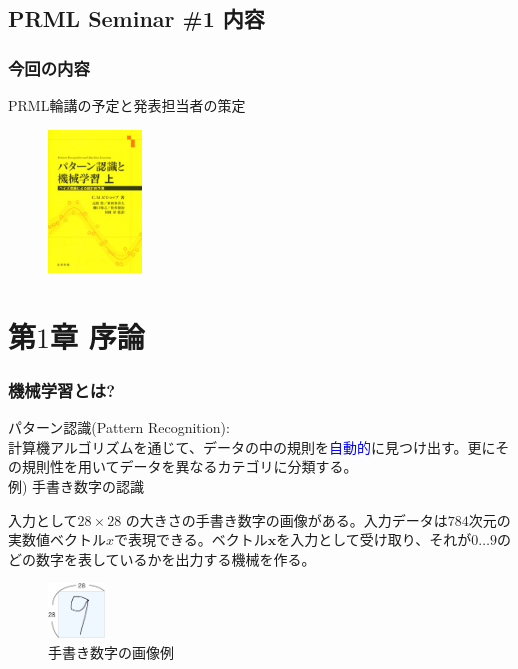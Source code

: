 \documentclass[dvipdfmx]{beamer}
\theoremstyle{definition}
\begin{document}
\subsection{PRML Seminar \#1 内容}
\begin{frame}
  \frametitle{今回の内容}
  PRML輪講の予定と発表担当者の策定
  \begin{figure}[htb]
    \centering
    \includegraphics[width=2.5cm,clip]{res/prml.eps}
  \end{figure}
\end{frame}

\section{第$1$章 \enspace 序論}

\begin{frame}
  \frametitle{機械学習とは?}
  パターン認識(Pattern Recognition): \\ 計算機アルゴリズムを通じて、データの中の規則を\textcolor{blue}{自動的}に見つけ出す。更にその規則性を用いてデータを異なるカテゴリに分類する。
  \\
  例) 手書き数字の認識
   
  入力として$28 \times 28$ の大きさの手書き数字の画像がある。入力データは$784$次元の実数値ベクトル$x$で表現できる。ベクトル$\bm{x}$を入力として受け取り、それが$0 \ldots 9 $のどの数字を表しているかを出力する機械を作る。
  \begin{figure}[htb]
    \centering
    \includegraphics[width=1.5cm,clip]{res/handwritten.eps}
    \caption{手書き数字の画像例}
  \end{figure}
\end{frame}
\end{document}
